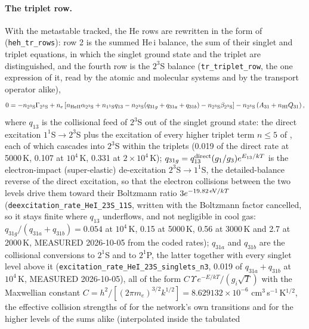 \paragraph{The triplet row.} With the metastable tracked, the He rows are
rewritten in the form of \citet{Oklopcic2018} (\texttt{heh\_tr\_rows}): row 2
is the summed He\,{\sc i} balance, the sum of their singlet and triplet
equations, in which the singlet ground state and the triplet are
distinguished, and the fourth row is the $2^3$S balance
(\texttt{tr\_triplet\_row}, the one expression of it, read by the atomic and
molecular systems and by the transport operator alike),
\begin{equation}
0 = -n_{2^3{\rm S}}\Gamma_{2^3{\rm S}}
    + n_e\left[n_{\rm HeII}\alpha_{2^3{\rm S}}
             + n_{1^1{\rm S}}q_{13}
             - n_{2^3{\rm S}}(q_{31g}+q_{31a}+q_{31b})
             - n_{2^3{\rm S}}\beta_{2^3{\rm S}}\right]
    - n_{2^3{\rm S}}\left(A_{31}+n_{\rm HI}Q_{31}\right),
\label{eq:ion:tripletrow}
\end{equation}
where $q_{13}$ is the collisional feed of $2^3$S out of the singlet
ground state: the direct excitation $1^1$S$\to2^3$S plus the excitation of
every higher triplet term $n\le5$ of \citet[Table~2]{Bray2000}, each of which cascades
into $2^3$S within the triplets (0.019 of the direct rate at 5000\,K, 0.107
at $10^4$\,K, 0.331 at $2\times10^4$\,K); $q_{31g} =
q^{\rm direct}_{13}(g_1/g_3)e^{E_{13}/kT}$ is the electron-impact
(super-elastic) de-excitation $2^3$S$\to1^1$S, the detailed-balance reverse of
the direct excitation, so that the electron collisions between the two levels
drive them toward their Boltzmann ratio $3e^{-19.82\,{\rm eV}/kT}$
(\texttt{deexcitation\_rate\_HeI\_23S\_11S}, written with the Boltzmann factor
cancelled, so it stays finite where $q_{13}$ underflows, and not negligible
in cool gas: $q_{31g}/(q_{31a}+q_{31b}) = 0.054$ at $10^4$\,K, 0.15 at
5000\,K, 0.56 at 3000\,K and 2.7 at 2000\,K, MEASURED 2026-10-05 from the
coded rates); $q_{31a}$ and $q_{31b}$ are the
collisional conversions to $2^1$S and to $2^1$P, the latter together with
every singlet level above it (\texttt{excitation\_rate\_HeI\_23S\_singlets\_n3},
0.019 of $q_{31a}+q_{31b}$ at $10^4$\,K, MEASURED 2026-10-05), all
of the form $C\,\Upsilon\,e^{-E/kT}/(g_i\sqrt{T})$ with the Maxwellian
constant $C = h^2/[(2\pi m_e)^{3/2}k^{1/2}] = 8.629132\times10^{-6}$
cm$^3$\,s$^{-1}$\,K$^{1/2}$, the effective collision strengths of
\citet[Tables~2 and 3]{Bray2000} for the network's own transitions and for
the higher levels of the sums alike (interpolated inside the tabulated
